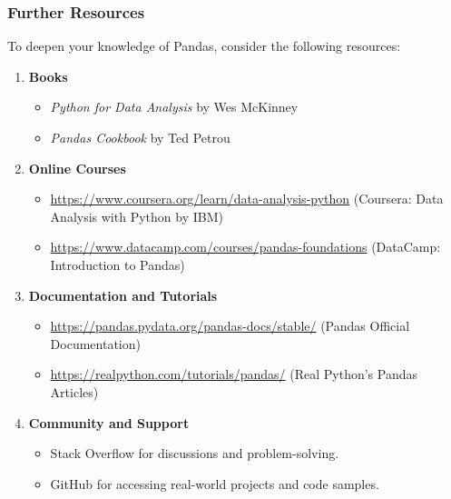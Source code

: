 \documentclass{beamer}
\begin{document}
\begin{frame}[fragile]
    \frametitle{Further Resources}
    To deepen your knowledge of Pandas, consider the following resources:
    
    \begin{enumerate}
        \item \textbf{Books}
        \begin{itemize}
            \item \textit{Python for Data Analysis} by Wes McKinney
            \item \textit{Pandas Cookbook} by Ted Petrou
        \end{itemize}
        
        \item \textbf{Online Courses}
        \begin{itemize}
            \item \url{https://www.coursera.org/learn/data-analysis-python} (Coursera: Data Analysis with Python by IBM)
            \item \url{https://www.datacamp.com/courses/pandas-foundations} (DataCamp: Introduction to Pandas)
        \end{itemize}
        
        \item \textbf{Documentation and Tutorials}
        \begin{itemize}
            \item \url{https://pandas.pydata.org/pandas-docs/stable/} (Pandas Official Documentation)
            \item \url{https://realpython.com/tutorials/pandas/} (Real Python's Pandas Articles)
        \end{itemize}
        
        \item \textbf{Community and Support}
        \begin{itemize}
            \item Stack Overflow for discussions and problem-solving.
            \item GitHub for accessing real-world projects and code samples.
        \end{itemize}
    \end{enumerate}
\end{frame}
\end{document}
